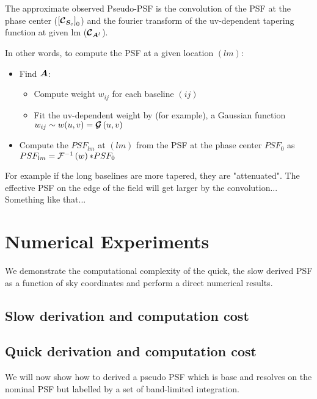 The approximate observed Pseudo-PSF is the convolution of the PSF at
the phase center ($\left[\bm{\mathcal{C}}_{\bm{S}_{c}}\right]_0$) and the fourier transform of the uv-dependent tapering function at given
lm ($\bm{\mathcal{C}}_{\bm{A}^l}$).

In other words, to compute the PSF at a given location $(lm)$:

\begin{itemize}
  \item Find $\bm{A}$:
    \begin{itemize}
    \item Compute weight $w_{ij}$ for each baseline $(ij)$
    \item Fit the uv-dependent weight by (for example), a Gaussian function $w_{ij}\sim w(u,v)=\bm{\mathcal{G}}\left(u,v\right)$ 
    \end{itemize}
  \item Compute the $PSF_{lm}$ at $(lm)$ from the PSF at the phase center $PSF_0$ as $PSF_{lm}=\mathcal{F}^{-1}\left(w\right)\mathcal{*} PSF_0$
\end{itemize}
For example if the long baselines are more tapered, they are
"attenuated". The effective PSF on the edge of the field will get
larger by the convolution...
Something like that...
\section{Numerical Experiments}
We demonstrate the computational complexity of the quick, the slow derived PSF as a function of sky coordinates and 
perform a direct numerical results.
\subsection{Slow derivation and computation cost}
\subsection{Quick derivation and computation cost}
We will now show how to derived a pseudo PSF  which is base and resolves on the nominal PSF
but labelled by a set of band-limited integration.

